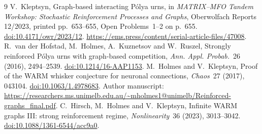 \documentclass[11pt]{article}
\begin{document}
\begin{thebibliography}{9}
 V.~Kleptsyn, Graph-based interacting P\'olya urns,
in
\emph{MATRIX--MFO Tandem Workshop: Stochastic Reinforcement Processes and
Graphs}, Oberwolfach Reports 12/2023, printed pp.~653--655,
Open Problems~1--2 on p.~655.
\href{https://doi.org/10.4171/owr/2023/12}{doi:10.4171/owr/2023/12}.
\url{https://ems.press/content/serial-article-files/47008}.
 R.~van der Hofstad, M.~Holmes, A.~Kuznetsov and W.~Ruszel,
Strongly reinforced P\'olya urns with graph-based competition,
\emph{Ann. Appl. Probab.}~26 (2016), 2494--2539.
\href{https://doi.org/10.1214/16-AAP1153}{doi:10.1214/16-AAP1153}.
 M.~Holmes and V.~Kleptsyn,
Proof of the WARM whisker conjecture for neuronal connections,
\emph{Chaos}~27 (2017), 043104.
\href{https://doi.org/10.1063/1.4978683}{doi:10.1063/1.4978683}.
Author manuscript:
\url{https://researchers.ms.unimelb.edu.au/~mholmes1@unimelb/Reinforced-graphs_final.pdf}.
 C.~Hirsch, M.~Holmes and V.~Kleptsyn,
Infinite WARM graphs III: strong reinforcement regime,
\emph{Nonlinearity}~36 (2023), 3013--3042.
\href{https://doi.org/10.1088/1361-6544/acc9a0}{doi:10.1088/1361-6544/acc9a0}.
\end{thebibliography}
\end{document}
